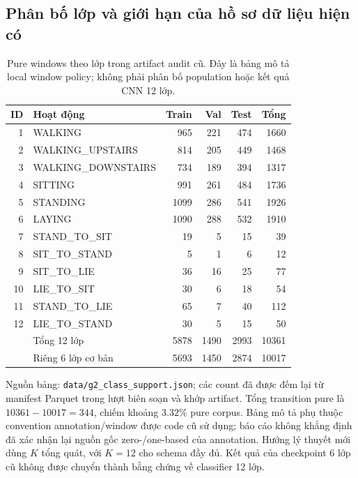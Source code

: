 \documentclass[11pt,a4paper]{article}
\newcommand{\code}[1]{{\small\ttfamily\nolinkurl{#1}}}
\theoremstyle{remark}
\begin{document}
\subsection{Phân bố lớp và giới hạn của hồ sơ dữ liệu hiện có}
\begin{table}[htbp]\centering\small
\caption{Pure windows theo lớp trong artifact audit cũ. Đây là bảng mô tả
local window policy; không phải phân bố population hoặc kết quả CNN 12 lớp.}
\label{tab:classes}
\begin{tabularx}{\linewidth}{@{}rYrrrr@{}}\toprule
ID & Hoạt động & Train & Val & Test & Tổng\\ & WALKING &965&221&474&1660\\
2 & WALKING\_UPSTAIRS &814&205&449&1468\\
3 & WALKING\_DOWNSTAIRS &734&189&394&1317\\
4 & SITTING &991&261&484&1736\\
5 & STANDING &1099&286&541&1926\\
6 & LAYING &1090&288&532&1910\\
7 & STAND\_TO\_SIT &19&5&15&39\\
8 & SIT\_TO\_STAND &5&1&6&12\\
9 & SIT\_TO\_LIE &36&16&25&77\\
10 & LIE\_TO\_SIT &30&6&18&54\\
11 & STAND\_TO\_LIE &65&7&40&112\\
12 & LIE\_TO\_STAND &30&5&15&50\\\midrule
 & Tổng 12 lớp &5878&1490&2993&10361\\
 & Riêng 6 lớp cơ bản &5693&1450&2874&10017\\\bottomrule
\end{tabularx}
\end{table}
Nguồn bảng: \code{data/g2_class_support.json}; các count đã được đếm lại
từ manifest Parquet trong lượt biên soạn và khớp artifact. Tổng transition pure là
$10361-10017=344$, chiếm khoảng $3.32\%$ pure corpus. Bảng mô tả phụ thuộc
convention annotation/window được code cũ sử dụng; báo cáo không khẳng định
đã xác nhận lại nguồn gốc zero-/one-based của annotation. Hướng lý thuyết
mới dùng $K$ tổng quát, với $K=12$ cho schema đầy đủ. Kết quả của checkpoint
6 lớp cũ không được chuyển thành bằng chứng về classifier 12 lớp.
\end{document}
